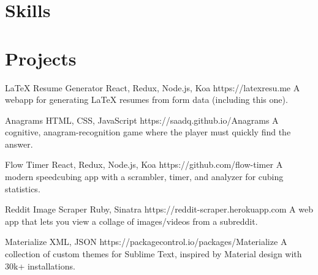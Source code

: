 \documentclass[]{friggeri-cv}
\begin{document}
\section{Skills}
\begin{entrylist}
\end{entrylist}


\section{Projects}
\begin{entrylist}
\entry
    {}
    {LaTeX Resume Generator {\normalfont React, Redux, Node.js, Koa}}
    {https://latexresu.me}
    {A webapp for generating LaTeX resumes from form data (including this one).}
    
\entry
    {}
    {Anagrams {\normalfont HTML, CSS, JavaScript}}
    {https://saadq.github.io/Anagrams}
    {A cognitive, anagram-recognition game where the player must quickly find the answer.}
    
\entry
    {}
    {Flow Timer {\normalfont React, Redux, Node.js, Koa}}
    {https://github.com/flow-timer}
    {A modern speedcubing app with a scrambler, timer, and analyzer for cubing statistics.}
    
\entry
    {}
    {Reddit Image Scraper {\normalfont Ruby, Sinatra}}
    {https://reddit-scraper.herokuapp.com}
    {A web app that lets you view a collage of images/videos from a subreddit.}
    
\entry
    {}
    {Materialize {\normalfont XML, JSON}}
    {https://packagecontrol.io/packages/Materialize}
    {A collection of custom themes for Sublime Text, inspired by Material design with 30k+ installations.}
    
\end{entrylist}
\end{document}
